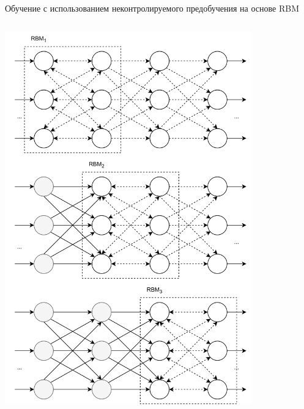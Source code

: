 \documentclass[10pt]{beamer}
\begin{document}
\begin{frame}{Обучение с использованием неконтролируемого предобучения на основе RBM}
\begin{columns}
\begin{column}{0.5\textwidth}
                    \includegraphics[width=0.8\textwidth]{full_network_training.png}
                \end{column}
            \end{columns}
        \end{frame}
\end{document}
